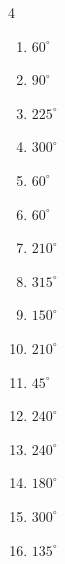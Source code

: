 \begin{multicols}{4}
\begin{enumerate}
  \item $\displaystyle 60^{\circ}$

  \item $\displaystyle 90^{\circ}$

  \item $\displaystyle 225^{\circ}$

  \item $\displaystyle 300^{\circ}$

  \item $\displaystyle 60^{\circ}$

  \item $\displaystyle 60^{\circ}$

  \item $\displaystyle 210^{\circ}$

  \item $\displaystyle 315^{\circ}$

  \item $\displaystyle 150^{\circ}$

  \item $\displaystyle 210^{\circ}$

  \item $\displaystyle 45^{\circ}$

  \item $\displaystyle 240^{\circ}$

  \item $\displaystyle 240^{\circ}$

  \item $\displaystyle 180^{\circ}$
        \phantom{$\displaystyle =\pi$}

  \item $\displaystyle 300^{\circ}$

  \item $\displaystyle 135^{\circ}$


\end{enumerate}
\end{multicols}
